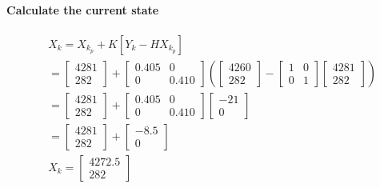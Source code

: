 \paragraph{Calculate the current state}
$$
\begin{aligned}
&X_k=X_{k_p}+K\left[Y_k-H X_{k_p}\right]\\
&=\left[\begin{array}{l}
4281 \\
282
\end{array}\right]+\left[\begin{array}{cc}
0.405 & 0 \\
0 & 0.410
\end{array}\right]\left(\left[\begin{array}{l}
4260 \\
282
\end{array}\right]-\left[\begin{array}{cc}
1 & 0 \\
0 & 1
\end{array}\right]\left[\begin{array}{ll}
4281 \\
282
\end{array}\right]\right)\\
&=\left[\begin{array}{c}
4281 \\
282
\end{array}\right]+\left[\begin{array}{cc}
0.405 & 0 \\
0 & 0.410
\end{array}\right]\left[\begin{array}{c}
-21 \\
0
\end{array}\right]\\
&=\left[\begin{array}{c}
4281 \\
282
\end{array}\right]+\left[\begin{array}{c}
-8.5 \\
0
\end{array}\right]\\
&X_k=\left[\begin{array}{c}
4272.5 \\
282
\end{array}\right]
\end{aligned}
$$
